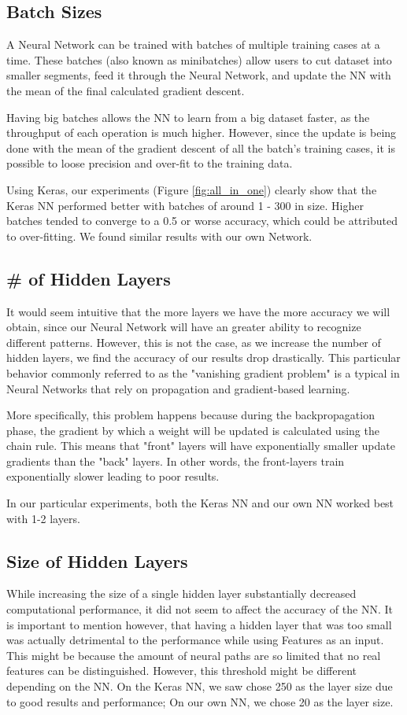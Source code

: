 \documentclass[11pt,onecolumn]{article} %
\begin{document}
	\subsection{Batch Sizes}
	A Neural Network can be trained with batches of multiple training cases at a time. These batches (also known as minibatches) allow users to cut dataset into smaller segments, feed it through the Neural Network, and update the NN with the mean of the final calculated gradient descent.
	\par Having big batches allows the NN to learn from a big dataset faster, as the throughput of each operation is much higher. However, since the update is being done with the mean of the gradient descent of all the batch's training cases, it is possible to loose precision and over-fit to the training data.
	\par Using Keras, our experiments (Figure \ref{fig:all_in_one}) clearly show that the Keras NN performed better with batches of around 1 - 300 in size. Higher batches tended to converge to a 0.5 or worse accuracy, which could be attributed to over-fitting. We found similar results with our own Network.
	
	\subsection{\# of Hidden Layers}
	It would seem intuitive that the more layers we have the more accuracy we will obtain, since our Neural Network will have an greater ability to recognize different patterns. However, this is not the case, as we increase the number of hidden layers, we find the accuracy of our results drop drastically. This particular behavior commonly referred to as the "vanishing gradient problem"  \cite{hochreiter1998vanishing} is a typical in Neural Networks that rely on propagation and gradient-based learning.
	\par More specifically, this problem happens because during the backpropagation phase, the gradient by which a weight will be updated is calculated using the chain rule. This means that "front" layers will have exponentially smaller update gradients than the "back" layers. In other words, the front-layers train exponentially slower leading to poor results.
	\par In our particular experiments, both the Keras NN and our own NN worked best with 1-2 layers.
	
	\subsection{Size of Hidden Layers}
	While increasing the size of a single hidden layer substantially decreased computational performance, it did not seem to affect the accuracy of the NN. It is important to mention however, that having a hidden layer that was too small was actually detrimental to the performance while using Features as an input. This might be because the amount of neural paths are so limited that no real features can be distinguished. However, this threshold might be different depending on the NN. On the Keras NN, we saw chose 250 as the layer size due to good results and performance; On our own NN, we chose 20 as the layer size.
	
\end{document}
